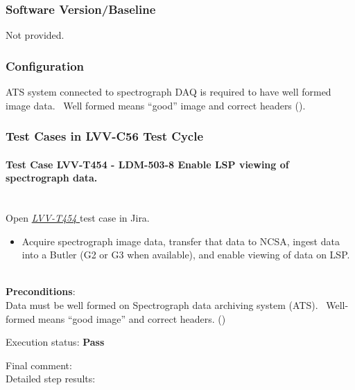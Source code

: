 \documentclass[DM,lsstdraft,STR,toc]{lsstdoc}
\providecommand{\tightlist}{
  \setlength{\itemsep}{0pt}\setlength{\parskip}{0pt}}
\begin{document}
  \subsubsection{Software Version/Baseline}
    Not provided.

  \subsubsection{Configuration}
    ATS system connected to spectrograph DAQ is required to have well formed
image data. ~Well formed means ``good'' image and correct headers
(). ~\\[2\baselineskip]


  \subsubsection{Test Cases in LVV-C56 Test Cycle}


    \paragraph{Test Case LVV-T454 - LDM-503-8 Enable LSP viewing of spectrograph data.
 }\mbox{}\\

Open  \href{https://jira.lsstcorp.org/secure/Tests.jspa#/testCase/LVV-T454}{\textit{ LVV-T454 } }
test case in Jira.

    \begin{itemize}
\tightlist
\item
  Acquire spectrograph image data, transfer that data to NCSA, ingest
  data into a Butler (G2 or G3 when available), and enable viewing of
  data on LSP. ~
\end{itemize}


    \textbf{ Preconditions}:\\
    Data must be well formed on Spectrograph data archiving system (ATS).
~Well-formed means ``good image'' and correct headers. () ~


    Execution status: {\bf Pass }

    Final comment:\\


    Detailed step results:
\end{document}

